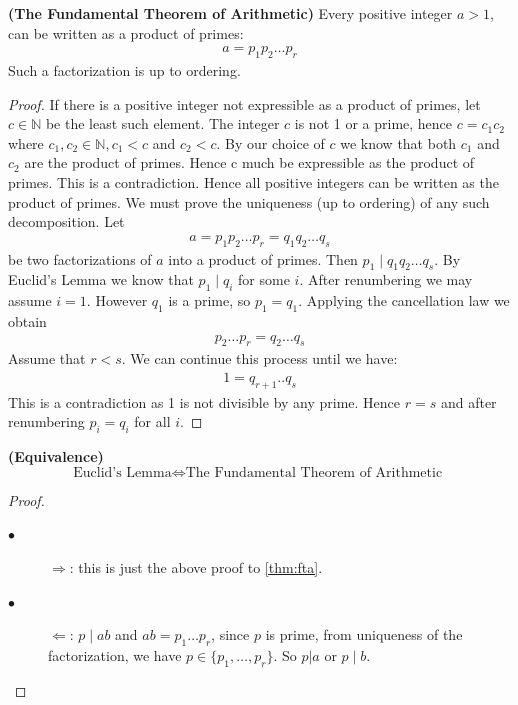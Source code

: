 \documentclass{article}
\newcommand{\bfs}[1]{\textbf{({#1}) }}
\begin{document}
\begin{thma}{\bfs{The Fundamental Theorem of Arithmetic}}\label{thm:fta}
Every positive integer $a>1$, can be written as a product of primes:
\begin{align*}
a=p_{1} p_{2} \ldots p_{r}
\end{align*}
Such a factorization is  up to ordering.
\end{thma}
\begin{proof}
If there is a positive integer not expressible as a product of primes, let $c \in \mathbb{N}$ be the least such element. The integer $c$ is not 1 or a prime, hence $c=c_{1} c_{2}$ where $c_{1}, c_{2} \in \mathbb{N}, c_{1}<c$ and $c_{2}<c .$ By our choice of $c$ we know that both $c_{1}$ and $c_{2}$ are the product of primes. Hence c much be expressible as the product of primes. This is a contradiction. Hence all positive integers can be written as the product of primes. We must prove the uniqueness (up to ordering) of any such decomposition. Let
\begin{align*}
a=p_{1} p_{2} \ldots p_{r}=q_{1} q_{2} \ldots q_{s}
\end{align*}
be two factorizations of $a$ into a product of primes. Then $p_{1} \mid q_{1} q_{2} \ldots q_{s} .$ By Euclid's Lemma we know that $p_{1} \mid q_{i}$ for some $i$. After renumbering we may assume $i=1$. However $q_{1}$ is a prime, so $p_{1}=q_{1} .$ Applying the cancellation law we obtain
\begin{align*}
p_{2} \ldots p_{r}=q_{2} \ldots q_{s}
\end{align*}
Assume that $r<s$. We can continue this process until we have:
\begin{align*}
1=q_{r+1} . . q_{s}
\end{align*}
This is a contradiction as 1 is not divisible by any prime. Hence $r=s$ and after renumbering $p_{i}=q_{i}$ for all $i$.
\end{proof} 
\begin{cora}{\bfs{Equivalence}}
$$\text{Euclid’s Lemma} \Longleftrightarrow \text{The Fundamental Theorem of Arithmetic }$$
\end{cora}
\begin{proof} \text{ } \
\begin{description}
  \item[$\bullet$] $\Longrightarrow$: this is just the above proof to \cref{thm:fta}.
  \item[$\bullet$]$\Longleftarrow$: $p\mid ab$ and $ab=p_1\ldots p_r$, since $p$ is prime, from uniqueness of the factorization, we have $p\in\{p_1,\ldots,p_r\}$. So $p| a \text { or } p \mid b$.
\end{description}
\end{proof}
\end{document}
